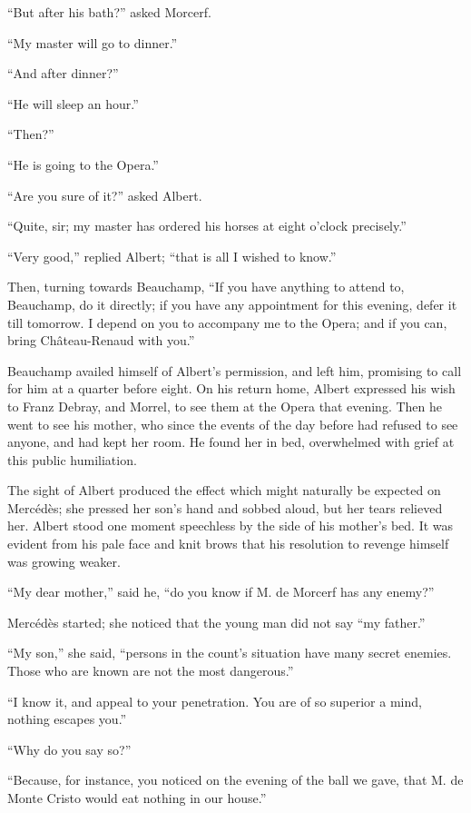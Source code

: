 “But after his bath?” asked Morcerf.

“My master will go to dinner.”

“And after dinner?”

“He will sleep an hour.”

“Then?”

“He is going to the Opera.”

“Are you sure of it?” asked Albert.

“Quite, sir; my master has ordered his horses at eight o’clock
precisely.”

“Very good,” replied Albert; “that is all I wished to know.”

Then, turning towards Beauchamp, “If you have anything to attend to,
Beauchamp, do it directly; if you have any appointment for this
evening, defer it till tomorrow. I depend on you to accompany me to the
Opera; and if you can, bring Château-Renaud with you.”

Beauchamp availed himself of Albert’s permission, and left him,
promising to call for him at a quarter before eight. On his return
home, Albert expressed his wish to Franz Debray, and Morrel, to see
them at the Opera that evening. Then he went to see his mother, who
since the events of the day before had refused to see anyone, and had
kept her room. He found her in bed, overwhelmed with grief at this
public humiliation.

The sight of Albert produced the effect which might naturally be
expected on Mercédès; she pressed her son’s hand and sobbed aloud, but
her tears relieved her. Albert stood one moment speechless by the side
of his mother’s bed. It was evident from his pale face and knit brows
that his resolution to revenge himself was growing weaker.

“My dear mother,” said he, “do you know if M. de Morcerf has any
enemy?”

Mercédès started; she noticed that the young man did not say “my
father.”

“My son,” she said, “persons in the count’s situation have many secret
enemies. Those who are known are not the most dangerous.”

“I know it, and appeal to your penetration. You are of so superior a
mind, nothing escapes you.”

“Why do you say so?”

“Because, for instance, you noticed on the evening of the ball we gave,
that M. de Monte Cristo would eat nothing in our house.”

